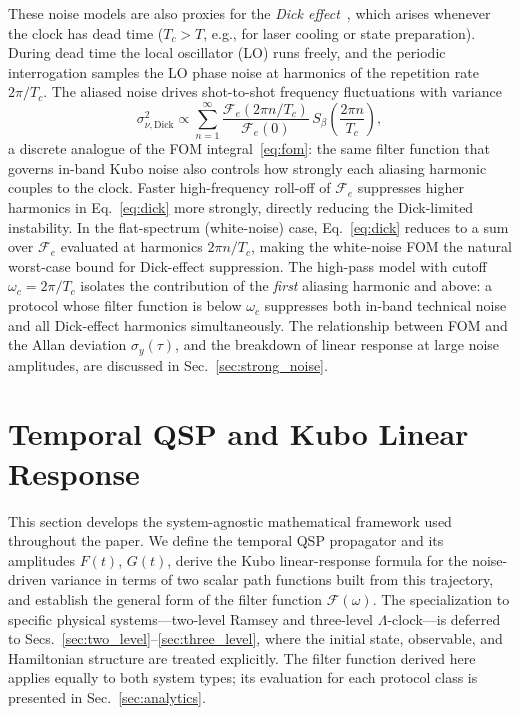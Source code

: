 \documentclass[aps,pra,twocolumn,superscriptaddress,longbibliography]{revtex4-2}
\newcommand{\be}{\begin{equation}}
\newcommand{\ee}{\end{equation}}
\begin{document}
These noise models are also proxies for the \emph{Dick effect}~\cite{Dick1987,Santarelli1998},
which arises whenever the clock has dead time ($T_c > T$, e.g., for laser cooling or
state preparation).
During dead time the local oscillator (LO) runs freely, and the periodic interrogation
samples the LO phase noise at harmonics of the repetition rate $2\pi/T_c$.
The aliased noise drives shot-to-shot frequency fluctuations with variance
\be
  \sigma^2_{\nu,\mathrm{Dick}} \propto
    \sum_{n=1}^{\infty} \frac{\mathcal{F}_e(2\pi n/T_c)}{\mathcal{F}_e(0)}\,
    S_\beta\!\left(\frac{2\pi n}{T_c}\right),
  \label{eq:dick}
\ee
a discrete analogue of the FOM integral~\eqref{eq:fom}: the same filter function
that governs in-band Kubo noise also controls how strongly each aliasing harmonic
couples to the clock.
Faster high-frequency roll-off of $\mathcal{F}_e$ suppresses higher harmonics in
Eq.~\eqref{eq:dick} more strongly, directly reducing the Dick-limited instability.
In the flat-spectrum (white-noise) case, Eq.~\eqref{eq:dick} reduces to a
sum over $\mathcal{F}_e$ evaluated at harmonics $2\pi n/T_c$, making the white-noise
FOM the natural worst-case bound for Dick-effect suppression.
The high-pass model with cutoff $\omega_c = 2\pi/T_c$ isolates the contribution of
the \emph{first} aliasing harmonic and above: a protocol whose filter function is
below $\omega_c$ suppresses both in-band technical noise and all Dick-effect harmonics
simultaneously.
The relationship between FOM and the Allan deviation $\sigma_y(\tau)$, and the
breakdown of linear response at large noise amplitudes, are discussed in
Sec.~\ref{sec:strong_noise}.


\section{Temporal QSP and Kubo Linear Response}
\label{sec:temporal_qsp}

This section develops the system-agnostic mathematical framework used throughout the paper.
We define the temporal QSP propagator and its amplitudes $F(t)$, $G(t)$,
derive the Kubo linear-response formula for the noise-driven variance in terms of two
scalar path functions built from this trajectory, and establish the general form of the
filter function $\mathcal{F}(\omega)$.
The specialization to specific physical systems---two-level Ramsey and three-level
$\Lambda$-clock---is deferred to Secs.~\ref{sec:two_level}--\ref{sec:three_level},
where the initial state, observable, and Hamiltonian structure are treated explicitly.
The filter function derived here applies equally to both system types;
its evaluation for each protocol class is presented in Sec.~\ref{sec:analytics}.
\end{document}
